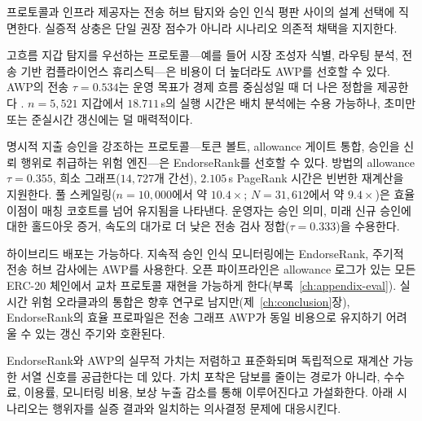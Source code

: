 
프로토콜과 인프라 제공자는 전송 허브 탐지와 승인 인식 평판 사이의 설계 선택에 직면한다. 실증적 상충은 단일 권장 점수가 아니라 시나리오 의존적 채택을 지지한다.


고흐름 지갑 탐지를 우선하는 프로토콜---예를 들어 시장 조성자 식별, 라우팅 분석, 전송 기반 컴플라이언스 휴리스틱---은 비용이 더 높더라도 AWP를 선호할 수 있다. AWP의 전송 $\tau=0.534$는 운영 목표가 경제 흐름 중심성일 때 더 나은 정합을 제공한다 . $n=5{,}521$ 지갑에서 $18.711$\,s의 실행 시간은 배치 분석에는 수용 가능하나, 초미만 또는 준실시간 갱신에는 덜 매력적이다.


명시적 지출 승인을 강조하는 프로토콜---토큰 볼트, allowance 게이트 통합, 승인을 신뢰 행위로 취급하는 위험 엔진---은 EndorseRank를 선호할 수 있다. 방법의 allowance $\tau=0.355$, 희소 그래프($14{,}727$개 간선), $2.105$\,s PageRank 시간은 빈번한 재계산을 지원한다. 풀 스케일링($n=10{,}000$에서 약 $10.4\times$; $N=31{,}612$에서 약 $9.4\times$)은 효율 이점이 매칭 코호트를 넘어 유지됨을 나타낸다. 운영자는 승인 의미, 미래 신규 승인에 대한 홀드아웃 증거, 속도의 대가로 더 낮은 전송 검사 정합($\tau=0.333$)을 수용한다.


하이브리드 배포는 가능하다. 지속적 승인 인식 모니터링에는 EndorseRank, 주기적 전송 허브 감사에는 AWP를 사용한다. 오픈 파이프라인은 allowance 로그가 있는 모든 ERC-20 체인에서 교차 프로토콜 재현을 가능하게 한다(부록~\ref{ch:appendix-eval}). 실시간 위험 오라클과의 통합은 향후 연구로 남지만(제~\ref{ch:conclusion}장), EndorseRank의 효율 프로파일은 전송 그래프 AWP가 동일 비용으로 유지하기 어려울 수 있는 갱신 주기와 호환된다.


EndorseRank와 AWP의 실무적 가치는 저렴하고 표준화되며 독립적으로 재계산 가능한 서열 신호를 공급한다는 데 있다. 가치 포착은 담보를 줄이는 경로가 아니라, 수수료, 이용률, 모니터링 비용, 보상 누출 감소를 통해 이루어진다고 가설화한다. 아래 시나리오는 행위자를 실증 결과와 일치하는 의사결정 문제에 대응시킨다.

